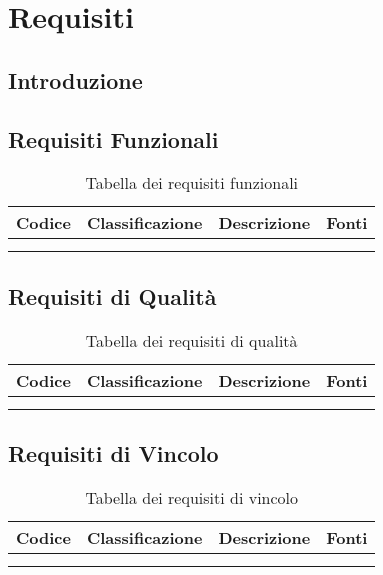 \chapter{Requisiti}

\section{Introduzione}
\section{Requisiti Funzionali}
\begin{table}[H]
  \centering
  \begin{tabular}{|c|c|c|c|}
    \hline
    \rowcolor[HTML]{036400}
    {\color[HTML]{FFFFFF} \textbf{Codice}} & {\color[HTML]{FFFFFF} \textbf{Classificazione}} & {\color[HTML]{FFFFFF} \textbf{Descrizione}} & {\color[HTML]{FFFFFF} \textbf{Fonti}} \\ \hline
    \rowcolor[HTML]{EFEFEF}
    &  &  &  \\ \hline
    \rowcolor[HTML]{C0C0C0}
    &  &  &  \\ \hline
  \end{tabular}
  \caption{Tabella dei requisiti funzionali}
\end{table}

\section{Requisiti di Qualità}
\begin{table}[H]
  \centering
  \begin{tabular}{|c|c|c|c|}
    \hline
    \rowcolor[HTML]{036400}
    {\color[HTML]{FFFFFF} \textbf{Codice}} & {\color[HTML]{FFFFFF} \textbf{Classificazione}} & {\color[HTML]{FFFFFF} \textbf{Descrizione}} & {\color[HTML]{FFFFFF} \textbf{Fonti}} \\ \hline
    \rowcolor[HTML]{EFEFEF}
    &  &  &  \\ \hline
    \rowcolor[HTML]{C0C0C0}
    &  &  &  \\ \hline
  \end{tabular}
  \caption{Tabella dei requisiti di qualità}
\end{table}

\section{Requisiti di Vincolo}
\begin{table}[H]
  \centering
  \begin{tabular}{|c|c|c|c|}
    \hline
    \rowcolor[HTML]{036400}
    {\color[HTML]{FFFFFF} \textbf{Codice}} & {\color[HTML]{FFFFFF} \textbf{Classificazione}} & {\color[HTML]{FFFFFF} \textbf{Descrizione}} & {\color[HTML]{FFFFFF} \textbf{Fonti}} \\ \hline
    \rowcolor[HTML]{EFEFEF}
    &  &  &  \\ \hline
    \rowcolor[HTML]{C0C0C0}
    &  &  &  \\ \hline
  \end{tabular}
  \caption{Tabella dei requisiti di vincolo}
\end{table}

